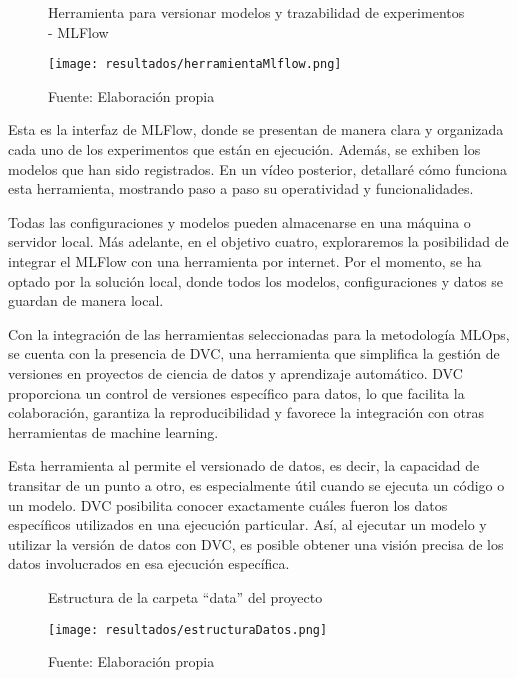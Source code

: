 \newpage

\begin{figure}[h]
\centering
\caption{Herramienta para versionar modelos y trazabilidad de experimentos - MLFlow}
\texttt{[image: resultados/herramientaMlflow.png]}
\caption*{\footnotesize Fuente: Elaboración propia}
\label{fig:figuraHerramientaMlflow}
\end{figure}

Esta es la interfaz de MLFlow, donde se presentan de manera clara y organizada cada uno de los experimentos que están en ejecución. Además, se exhiben los modelos que han sido registrados. En un vídeo posterior, detallaré cómo funciona esta herramienta, mostrando paso a paso su operatividad y funcionalidades. \newline

Todas las configuraciones y modelos pueden almacenarse en una máquina o servidor local. Más adelante, en el objetivo cuatro, exploraremos la posibilidad de integrar el MLFlow con una herramienta por internet. Por el momento, se ha optado por la solución local, donde todos los modelos, configuraciones y datos se guardan de manera local. \newline

Con la integración de las herramientas seleccionadas para la metodología MLOps, se cuenta con la presencia de DVC, una herramienta que simplifica la gestión de versiones en proyectos de ciencia de datos y aprendizaje automático. DVC proporciona un control de versiones específico para datos, lo que facilita la colaboración, garantiza la reproducibilidad y favorece la integración con otras herramientas de machine learning.

\newpage

Esta herramienta al permite el versionado de datos, es decir, la capacidad de transitar de un punto a otro, es especialmente útil cuando se ejecuta un código o un modelo. DVC posibilita conocer exactamente cuáles fueron los datos específicos utilizados en una ejecución particular. Así, al ejecutar un modelo y utilizar la versión de datos con DVC, es posible obtener una visión precisa de los datos involucrados en esa ejecución específica.

\begin{figure}[h]
\centering
\caption{Estructura de la carpeta ``data'' del proyecto}
\texttt{[image: resultados/estructuraDatos.png]}
\caption*{\footnotesize Fuente: Elaboración propia}
\label{fig:figuraEstructuraDatos}
\end{figure}

